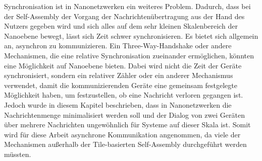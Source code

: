 Synchronisation ist in Nanonetzwerken ein weiteres Problem. Dadurch, dass bei der Self-Assembly der Vorgang der Nachrichtenübertragung aus der Hand des Nutzers gegeben wird und sich alles auf dem sehr kleinen Skalenbereich der Nanoebene bewegt, lässt sich Zeit schwer synchronisieren. Es bietet sich allgemein an, asynchron zu kommunizieren. Ein Three-Way-Handshake oder andere Mechanismen, die eine relative Synchronisation zueinander ermöglichen, könnten eine Möglichkeit auf Nanoebene bieten. Dabei wird nicht die Zeit der Geräte synchronisiert, sondern ein relativer Zähler oder ein anderer Mechanismus verwendet, damit die kommunizierenden Geräte eine gemeinsam festgelegte Möglichkeit haben, um festzustellen, ob eine Nachricht verloren gegangen ist. Jedoch wurde in diesem Kapitel beschrieben, dass in Nanonetzwerken die Nachrichtenmenge minimalisiert werden soll und der Dialog von zwei Geräten über mehrere Nachrichten ungewöhnlich für Systeme auf dieser Skala ist. Somit wird für diese Arbeit asynchrone Kommunikation angenommen, da viele der Mechanismen außerhalb der Tile-basierten Self-Assembly durchgeführt werden müssten.
